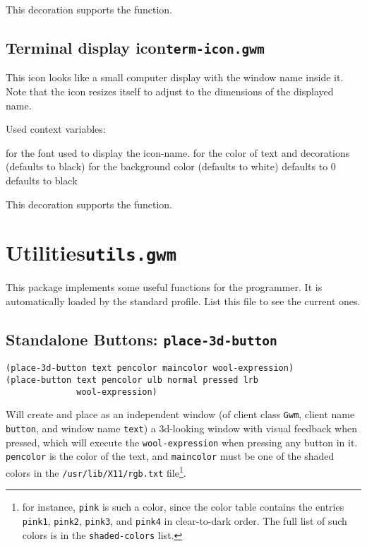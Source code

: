 This decoration supports the  function.

\subsection{Terminal display icon\hfill{\tt term-icon.gwm}}
\label{term-icon}

\centerline{}

This icon looks like a small computer display with the window name inside
it. Note that the icon resizes itself to adjust to the dimensions of the
displayed name.

Used context variables:

\begin{description}
 for the font used to display the icon-name.
 for the color of text and decorations (defaults
to black)
 for the background color (defaults
to white)
 defaults to 0
 defaults to black
\end{description}

This decoration supports the  function.

\section{Utilities\hfill{\tt utils.gwm}}
\label{utils}

This package implements some useful functions for the {\WOOL} programmer. It
is automatically loaded by the standard profile.  List this file to see the
current ones.

\subsection{Standalone Buttons: {\tt place-3d-button}}
\label{place-3d-button}

{\usagefont\begin{verbatim}
(place-3d-button text pencolor maincolor wool-expression)
(place-button text pencolor ulb normal pressed lrb 
              wool-expression)
\end{verbatim}}\usageupspace

Will create and place as an independent window (of client class \verb|Gwm|,
client name \verb|button|, and window name \verb|text|) a 3d-looking window
with visual feedback when pressed, which will execute the
\verb|wool-expression| when pressing any button in it. \verb|pencolor| is the
color of the text, and \verb|maincolor| must be one of the shaded colors in
the \verb|/usr/lib/X11/rgb.txt| file\footnote{for instance, \verb|pink| is
such a color, since the color table contains the entries \verb|pink1|,
\verb|pink2|, \verb|pink3|, and \verb|pink4| in clear-to-dark order. The full
list of such colors is in the \verb|shaded-colors| list.}.

